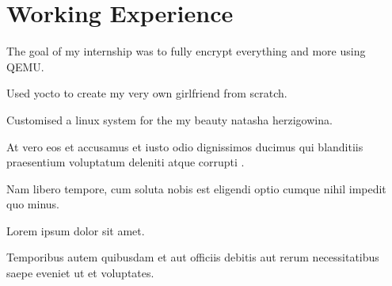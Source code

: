 \documentclass[]{resume}
\begin{document}
\begin{minipage}[t]{0.66\textwidth} 	
\section{Working Experience}
	 
	\vspace{\topsep} %
	\begin{tightemize}
		
		\item The goal of my internship was to fully encrypt everything and more using QEMU.
		\item Used yocto to create my very own girlfriend from scratch.
		\item Customised a linux system for the my beauty natasha herzigowina. 

	\end{tightemize}
	\sectionsep

	 
	\begin{tightemize}
		
		\item At vero eos et accusamus et iusto odio dignissimos ducimus qui blanditiis praesentium voluptatum deleniti atque corrupti .
		\item Nam libero tempore, cum soluta nobis est eligendi optio cumque nihil impedit quo minus. 	
		\item Lorem ipsum dolor sit amet.
		\item Temporibus autem quibusdam et aut officiis debitis aut rerum necessitatibus saepe eveniet ut et voluptates. 
		
	\end{tightemize}
	\sectionsep

	\begin{tightemize}
		

\end{tightemize}
\end{minipage}
\end{document}

